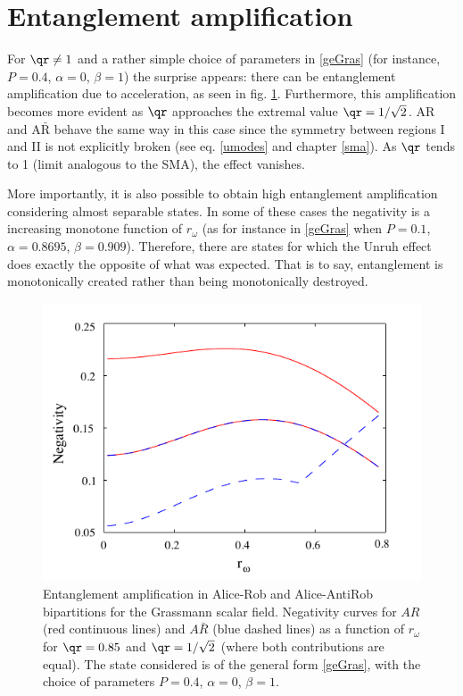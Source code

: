 \section{Entanglement amplification}

For $\qr\neq1$ and a rather simple choice of parameters in \eqref{geGras} (for instance, $P=0.4$, $\alpha=0$, $\beta=1$) the surprise appears: there can be entanglement amplification due to acceleration, as seen in fig. \ref{ent}. Furthermore, this amplification becomes more evident as $\qr$ approaches the extremal value $\qr=1/\sqrt{2}$.  AR and $\text{A}\bar{\text{R}}$ behave the same way in this case since the symmetry between regions I and II is not explicitly broken (see eq. \eqref{umodes} and chapter \ref{sma}). As $\qr$ tends to 1 (limit analogous to the SMA), the effect vanishes. 

More importantly, it is also possible to obtain high entanglement amplification considering almost separable states. In some of these cases the negativity is a increasing monotone function of $r_\omega$ (as for instance in \eqref{geGras} when $P=0.1$, $\alpha=0.8695$, $\beta=0.909$). Therefore, there are states for which the Unruh effect does exactly the opposite of what was expected. That is to say, entanglement is monotonically created rather than being monotonically destroyed.
\begin{figure}[h] 
\begin{center}
\includegraphics[width=.85\textwidth]{figabv5}
\end{center}
\caption{Entanglement amplification in Alice-Rob and Alice-AntiRob bipartitions for the Grassmann scalar field. Negativity curves for $AR$ (red continuous lines) and $A\bar R$ (blue dashed lines) as a function of $r_\omega$ for $\qr=0.85$ and $\qr=1/\sqrt{2}$ (where both contributions are equal). The state considered is of the general form \eqref{geGras}, with the choice of parameters $P=0.4$, $\alpha=0$, $\beta=1$. }
\label{ent}
\end{figure}

